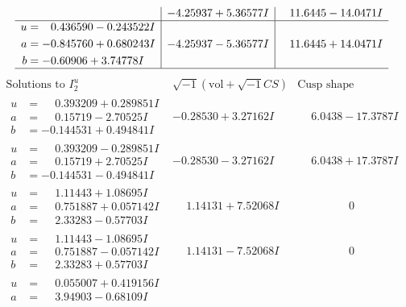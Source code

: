 \documentclass[1p]{elsarticle_modified}
\theoremstyle{definition}
\newcommand{\I}{\sqrt{-1}}
\begin{document}
$$\begin{array}{c|c|c}
 & -4.25937 + 5.36577 I & \phantom{-}11.6445 - 14.0471 I \\ \hline\begin{aligned}
u &= \phantom{-}0.436590 - 0.243522 I \\
a &= -0.845760 + 0.680243 I \\
b &= -0.60906 + 3.74778 I\end{aligned}
 & -4.25937 - 5.36577 I & \phantom{-}11.6445 + 14.0471 I\\
 \hline 
 \end{array}$$\newpage$$\begin{array}{c|c|c}  
\text{Solutions to }I^u_{2}& \I (\text{vol} + \sqrt{-1}CS) & \text{Cusp shape}\\
 \hline 
\begin{aligned}
u &= \phantom{-}0.393209 + 0.289851 I \\
a &= \phantom{-}0.15719 - 2.70525 I \\
b &= -0.144531 + 0.494841 I\end{aligned}
 & -0.28530 + 3.27162 I & \phantom{-}6.0438 - 17.3787 I \\ \hline\begin{aligned}
u &= \phantom{-}0.393209 - 0.289851 I \\
a &= \phantom{-}0.15719 + 2.70525 I \\
b &= -0.144531 - 0.494841 I\end{aligned}
 & -0.28530 - 3.27162 I & \phantom{-}6.0438 + 17.3787 I \\ \hline\begin{aligned}
u &= \phantom{-}1.11443 + 1.08695 I \\
a &= \phantom{-}0.751887 + 0.057142 I \\
b &= \phantom{-}2.33283 - 0.57703 I\end{aligned}
 & \phantom{-}1.14131 + 7.52068 I & \phantom{-0.000000 } 0 \\ \hline\begin{aligned}
u &= \phantom{-}1.11443 - 1.08695 I \\
a &= \phantom{-}0.751887 - 0.057142 I \\
b &= \phantom{-}2.33283 + 0.57703 I\end{aligned}
 & \phantom{-}1.14131 - 7.52068 I & \phantom{-0.000000 } 0 \\ \hline\begin{aligned}
u &= \phantom{-}0.055007 + 0.419156 I \\
a &= \phantom{-}3.94903 - 0.68109 I \\

\end{aligned}
\end{array}$$
\end{document}
